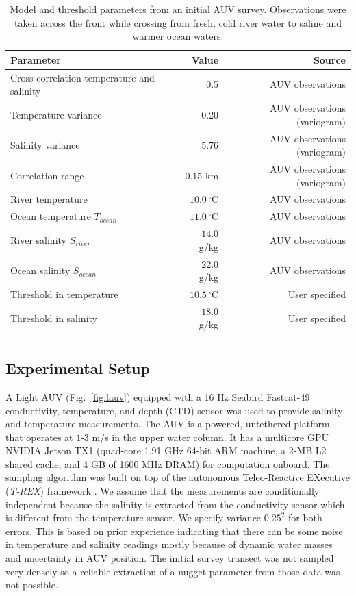 \documentclass[aoas,preprint]{imsart}
\begin{document}
\begin{table}[!h]
\centering
\begin{tabular}{lrr}
\toprule
Parameter & Value & Source\\
\midrule
\rowcolor{Gray}
Cross correlation temperature and salinity & 0.5 & AUV observations\\
Temperature variance &  0.20 & AUV observations (variogram)\\
\rowcolor{Gray}
Salinity variance &  5.76 & AUV observations (variogram)\\
Correlation range  & 0.15 km & AUV observations (variogram)\\
\rowcolor{Gray}
River temperature  & $10.0\,^{\circ}\mathrm{C}$ & AUV observations\\
Ocean temperature $T_{ocean}$ & $11.0\,^{\circ}\mathrm{C}$ & AUV observations\\
\rowcolor{Gray}
River salinity $S_{river}$ & $14.0$ g/kg & AUV observations\\
Ocean salinity $S_{ocean}$ & $22.0$ g/kg & AUV observations\\
\rowcolor{Gray}
Threshold in temperature & $10.5\,^{\circ}\mathrm{C}$ & User specified \\
Threshold in salinity & $18.0$ g/kg & User specified \\
\rowcolor{Gray}
\bottomrule
\end{tabular}
\caption{Model and threshold parameters from an initial AUV
  survey. Observations were taken across the front while crossing from
  fresh, cold river water to saline and warmer ocean waters.}
\label{tab:experiment_param}
\end{table}


\subsection{Experimental Setup}

A Light AUV \citep{sousa2012lauv} (Fig.~\ref{fig:lauv}) equipped with
a 16 Hz Seabird Fastcat-49 conductivity, temperature, and depth (CTD)
sensor was used to provide salinity and temperature measurements.  The
AUV is a powered, untethered platform that operates at $1$-$3$ m/s in
the upper water column. It has a multicore GPU NVIDIA Jetson TX1
(quad-core 1.91 GHz 64-bit ARM machine, a 2-MB L2 shared cache, and 4
GB of 1600 MHz DRAM) for computation onboard.  The sampling algorithm
was built on top of the autonomous Teleo-Reactive EXecutive
(\textit{T-REX}) framework \citep{py10,Rajan12,Rajan12b}. We assume
that the measurements are conditionally independent because the
salinity is extracted from the conductivity sensor which is different
from the temperature sensor. We specify variance $0.25^2$ for both
errors. This is based on prior experience indicating that there can be
some noise in temperature and salinity readings mostly because of
dynamic water masses and uncertainty in AUV position. The initial
survey transect was not sampled very densely so a reliable extraction
of a nugget parameter from those data was not possible.
\end{document}
